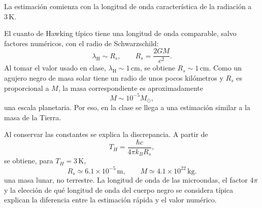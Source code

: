 La estimación comienza con la longitud de onda característica de la radiación a \(3\,\mathrm{K}\).

\begin{classroomqa}
\end{classroomqa}

El cuanto de Hawking típico tiene una longitud de onda comparable, salvo factores numéricos, con el radio de Schwarzschild:
\begin{equation}
\lambda_{\mathrm{H}}\sim R_s,
\qquad
R_s=\frac{2GM}{c^2}.
\label{eq:l05-scale}
\end{equation}
Al tomar el valor usado en clase, \(\lambda_{\mathrm H}\sim1\,\mathrm{cm}\), se obtiene \(R_s\sim1\,\mathrm{cm}\). Como un agujero negro de masa solar tiene un radio de unos pocos kilómetros y \(R_s\) es proporcional a \(M\), la masa correspondiente es aproximadamente
\begin{equation}
M\sim10^{-5}M_\odot,
\label{eq:l05-rough-mass}
\end{equation}
una escala planetaria. Por eso, en la clase se llega a una estimación similar a la masa de la Tierra.

\begin{classroomqa}
\end{classroomqa}

Al conservar las constantes se explica la discrepancia. A partir de
\begin{equation}
T_H=\frac{\hbar c}{4\pi k_B R_s},
\end{equation}
se obtiene, para \(T_H=3\,\mathrm{K}\),
\begin{equation}
R_s\simeq6.1\times10^{-5}\,\mathrm{m},
\qquad
M\simeq4.1\times10^{22}\,\mathrm{kg}.
\label{eq:l05-three-kelvin}
\end{equation}
una masa lunar, no terrestre. La longitud de onda de las microondas, el factor \(4\pi\) y la elección de qué longitud de onda del cuerpo negro se considera típica explican la diferencia entre la estimación rápida y el valor numérico.

